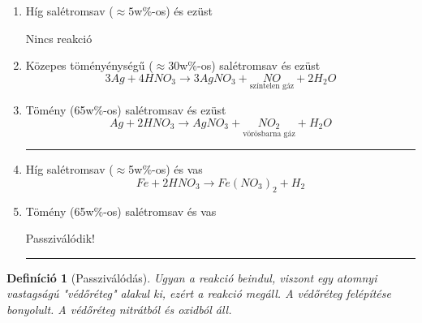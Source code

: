 \documentclass{article}
\newtheorem{definition}{Definíció}
\begin{document}
                        \begin{enumerate}
                            \item Híg salétromsav ($\approx5$w\%-os) és ezüst
                        
                            \setlength\parindent{110pt}
                            Nincs reakció
                            
                            \item Közepes töményénységű ($\approx$30w\%-os) salétromsav és ezüst
                            \[
                                3Ag + 4HNO_3 \rightarrow 3AgNO_3 + \underset{\text{színtelen gáz}}{NO} + 2H_2O
                            \]
                            \item Tömény (65w\%-os) salétromsav és ezüst
                            \[
                            Ag + 2HNO_3 \rightarrow AgNO_3 + \underset{\text{vörösbarna gáz}}{NO_2} + H_2O
                            \]
        
                            \hrule
                        
                            \item Híg salétromsav ($\approx$5w\%-os) és vas
                            \[
                                Fe + 2HNO_3 \rightarrow Fe(NO_3)_2 + H_2
                            \]
                            
                            \item Tömény (65w\%-os) salétromsav és vas
                            
                            \setlength\parindent{110pt}
                            Passziválódik!
        
                            \vspace{10pt}
                            \hrule
                            
                        \end{enumerate}
                        
                        \begin{definition}[Passziválódás]
                            Ugyan a reakció beindul, viszont egy atomnyi vastagságú "védőréteg" alakul ki, ezért a reakció megáll. A védőréteg felépítése bonyolult. A védőréteg nitrátból és oxidból áll.
                        \end{definition}
            
\end{document}
